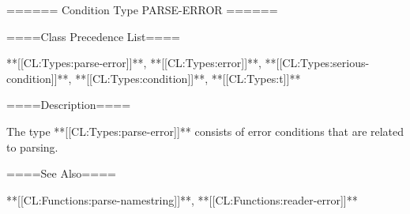 ====== Condition Type PARSE-ERROR ======

====Class Precedence List====

**[[CL:Types:parse-error]]**, **[[CL:Types:error]]**, **[[CL:Types:serious-condition]]**, **[[CL:Types:condition]]**, **[[CL:Types:t]]**

====Description====

The type **[[CL:Types:parse-error]]** consists of error conditions that are related to parsing.

====See Also====

**[[CL:Functions:parse-namestring]]**, **[[CL:Functions:reader-error]]**

  
